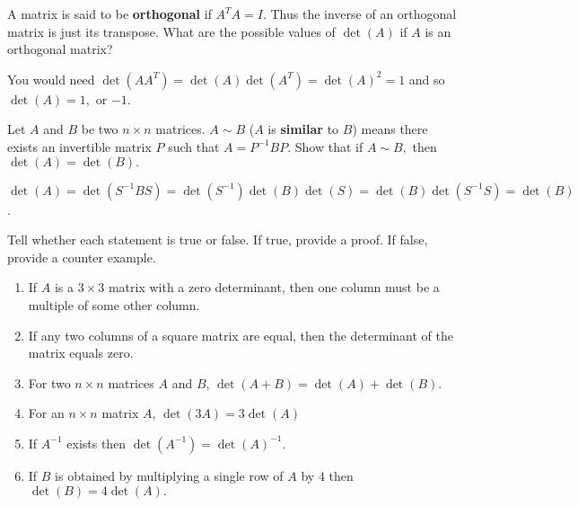\begin{enumialphparenastyle}
\begin{ex} \label{exerorthogonal}A matrix is said to be \textbf{orthogonal}  if 
$A^{T}A=I.$ Thus the inverse of an orthogonal matrix is just its transpose.
What are the possible values of $\det \left( A\right) $ if $A$ is an
orthogonal matrix? 
\begin{sol}
You would need $\det \left( AA^{T}\right) =\det
\left( A\right) \det \left( A^{T}\right) =\det \left( A\right) ^{2}=1$ and
so $\det \left( A\right) =1,$ or $-1$.
\end{sol}
\end{ex}

\begin{ex} Let $A$ and $B$ be two $n\times n$ matrices. $A\sim B$
($A$ is \textbf{similar} to $B$) means there exists an invertible matrix $P$
such that $A=P^{-1}BP.$ Show that if $A\sim B,$ then 
$\det \left( A\right) =\det \left( B\right) .$ 
\begin{sol}
$\det \left( A\right) =\det
\left( S^{-1}BS\right) =\det \left( S^{-1}\right) \det \left( B\right) \det
\left( S\right) =\det \left( B\right) \det \left( S^{-1}S\right) =\det
\left( B\right) $.
\end{sol}
\end{ex}

\begin{ex} Tell whether each statement is true or false. If true, provide a proof. If false, provide a counter example. 
\begin{enumerate}
\item If $A$ is a $3\times 3$ matrix with a zero determinant, then one
column must be a multiple of some other column.

\item If any two columns of a square matrix are equal, then the determinant
of the matrix equals zero.

\item For two $n\times n$ matrices $A$ and $B$, $\det \left( A+B\right)
=\det \left( A\right) +\det \left( B\right) .$

\item For an $n\times n$ matrix $A$, $\det \left( 3A\right) =3\det \left(
A\right) $

\item If $A^{-1}$ exists then $\det \left( A^{-1}\right) =\det \left(
A\right) ^{-1}.$

\item If $B$ is obtained by multiplying a single row of $A$ by $4$ then $%
\det \left( B\right) =4\det \left( A\right) .$


\end{enumerate}
\end{ex}
\end{enumialphparenastyle}
